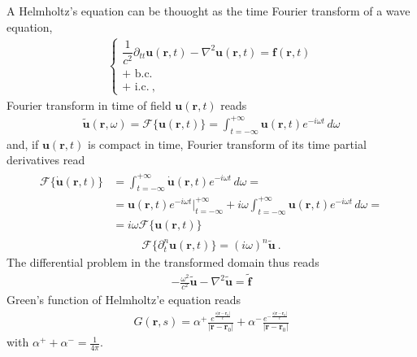 \documentclass[letterpaper,10pt,english]{jupyterBook}
\begin{document}
\sphinxAtStartPar
A Helmholtz’s equation can be thouoght as the time Fourier transform of a wave equation,
\begin{equation*}
\begin{split}\begin{cases}
  \dfrac{1}{c^2} \partial_{tt} \mathbf{u}(\mathbf{r},t) - \nabla^2 \mathbf{u}(\mathbf{r},t) = \mathbf{f}(\mathbf{r},t) \\
  \text{+ b.c.} \\
  \text{+ i.c.} \ ,
\end{cases}\end{split}
\end{equation*}
\sphinxAtStartPar
Fourier transform in time of field \(\mathbf{u}(\mathbf{r},t)\) reads
\begin{equation*}
\begin{split}\tilde{\mathbf{u}}(\mathbf{r}, \omega) = \mathscr{F}\{ \mathbf{u}(\mathbf{r},t) \} = \int_{t=-\infty}^{+\infty} \mathbf{u}(\mathbf{r},t) e^{-i \omega t} \, d \omega\end{split}
\end{equation*}
\sphinxAtStartPar
and, if \(\mathbf{u}(\mathbf{r},t)\) is compact in time, Fourier transform of its time partial derivatives read
\begin{equation*}
\begin{split}\begin{aligned}
  \mathscr{F}\{ \dot{\mathbf{u}}(\mathbf{r},t) \} 
  & = \int_{t=-\infty}^{+\infty} \dot{\mathbf{u}}(\mathbf{r},t) e^{-i \omega t} \, d \omega = \\
  & = \mathbf{u}(\mathbf{r},t) e^{-i \omega t} \big|_{t=-\infty}^{+\infty} + i \omega \int_{t=-\infty}^{+\infty} \mathbf{u}(\mathbf{r},t) e^{-i \omega t} \, d \omega = \\
  & = i \omega \mathscr{F}\{  \mathbf{u}(\mathbf{r},t) \}
\end{aligned}\end{split}
\end{equation*}\begin{equation*}
\begin{split}\mathscr{F}\{ \partial_t^n \mathbf{u}(\mathbf{r},t) \} = (i \omega)^n \tilde{\mathbf{u}} \ .\end{split}
\end{equation*}
\sphinxAtStartPar
The differential problem in the transformed domain thus reads
\begin{equation*}
\begin{split}- \frac{\omega^2}{c^2} \tilde{\mathbf{u}} - \nabla^2 \tilde{\mathbf{u}} = \tilde{\mathbf{f}}\end{split}
\end{equation*}
\sphinxAtStartPar
Green’s function of Helmholtz’e equation reads
\begin{equation*}
\begin{split}G(\mathbf{r}, s) =
  \alpha^+ \frac{e^{ \frac{s|\mathbf{r} - \mathbf{r}_0|}{c}}}{|\mathbf{r} - \mathbf{r}_0|} +
  \alpha^- \frac{e^{-\frac{s|\mathbf{r} - \mathbf{r}_0|}{c}}}{|\mathbf{r} - \mathbf{r}_0|}
\end{split}
\end{equation*}
\sphinxAtStartPar
with \(\alpha^+ + \alpha^- = \frac{1}{4 \pi}\).
\end{document}
